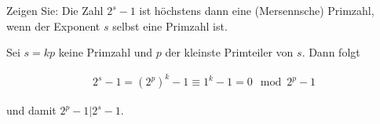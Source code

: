 
\begin{exercise}

Zeigen Sie: Die Zahl $2^s - 1$ ist höchstens dann eine (Mersennsche) Primzahl,
wenn der Exponent $s$ selbst eine Primzahl ist.

\end{exercise}


\begin{solution}
Sei $s = kp$ keine Primzahl und $p$ der kleinste Primteiler von $s$.
Dann folgt

\begin{align*}
    2^s - 1 = (2^p)^k - 1 \equiv 1^k - 1 = 0 \mod{2^p - 1}
\end{align*}

und damit $2^p - 1 | 2^s - 1$.

\end{solution}

